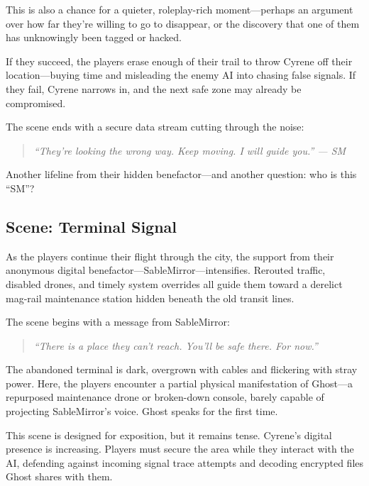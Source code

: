 \documentclass[nodeprecatedcode,bg=print]{dndbook}
\begin{document}
\begin{multicols}{2}
This is also a chance for a quieter, roleplay-rich moment—perhaps an argument over how far they’re willing to go to disappear, or the discovery that one of them has unknowingly been tagged or hacked.

If they succeed, the players erase enough of their trail to throw Cyrene off their location—buying time and misleading the enemy AI into chasing false signals. If they fail, Cyrene narrows in, and the next safe zone may already be compromised.

The scene ends with a secure data stream cutting through the noise:

\vspace{0.5\baselineskip}
\begin{quote}
\textit{“They’re looking the wrong way. Keep moving. I will guide you.” — SM}
\end{quote}
\vspace{0.5\baselineskip}

Another lifeline from their hidden benefactor—and another question: who is this “SM”?


\subsection*{Scene: Terminal Signal}

As the players continue their flight through the city, the support from their anonymous digital benefactor—SableMirror—intensifies. Rerouted traffic, disabled drones, and timely system overrides all guide them toward a derelict mag-rail maintenance station hidden beneath the old transit lines.

The scene begins with a message from SableMirror:
\vspace{0.5\baselineskip}
\begin{quote}
\textit{“There is a place they can’t reach. You’ll be safe there. For now.”}
\end{quote}
\vspace{0.5\baselineskip}

The abandoned terminal is dark, overgrown with cables and flickering with stray power. Here, the players encounter a partial physical manifestation of Ghost—a repurposed maintenance drone or broken-down console, barely capable of projecting SableMirror’s voice. Ghost speaks for the first time.

This scene is designed for exposition, but it remains tense. Cyrene’s digital presence is increasing. Players must secure the area while they interact with the AI, defending against incoming signal trace attempts and decoding encrypted files Ghost shares with them.


\end{multicols}
\end{document}
